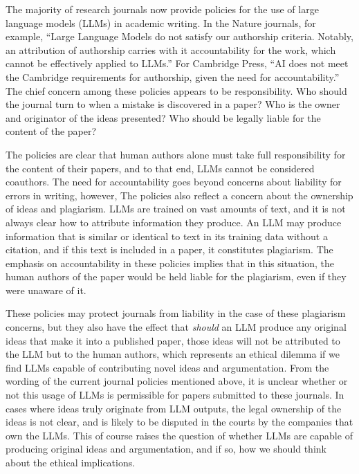 The majority of research journals now provide policies for the use of large
language models (LLMs) in academic writing. In the Nature journals, for example,
``Large Language Models do not satisfy our authorship criteria. Notably, an
attribution of authorship carries with it accountability for the work, which
cannot be effectively applied to LLMs.'' For Cambridge Press, ``AI does not meet
the Cambridge requirements for authorship, given the need for accountability.''
The chief concern among these policies appears to be responsibility. Who should
the journal turn to when a mistake is discovered in a paper? Who is the owner
and originator of the ideas presented? Who should be legally liable for the
content of the paper? 

The policies are clear that human authors alone must take
full responsibility for the content of their papers, and to that end, LLMs
cannot be considered coauthors. The need for accountability goes beyond concerns
about liability for errors in writing, however, The policies also reflect a
concern about the ownership of ideas and plagiarism. LLMs are trained on vast 
amounts of text, and it is not always clear how to attribute information they
produce. An LLM may produce information that is similar or identical to text in
its training data without a citation, and if this text is included in a paper,
it constitutes plagiarism. The emphasis on accountability in these policies
implies that in this situation, the human authors of the paper would be held
liable for the plagiarism, even if they were unaware of it.

These policies may protect journals from liability in the case of these 
plagiarism concerns, but they also have the effect that \emph{should} an LLM
produce any original ideas that make it into a published paper, those ideas will
not be attributed to the LLM but to the human authors, which represents an
ethical dilemma if we find LLMs capable of contributing novel ideas and
argumentation. From the wording of the current journal policies mentioned above,
it is unclear whether or not this usage of LLMs is permissible for papers
submitted to these journals. In cases where ideas truly originate from LLM
outputs, the legal ownership of the ideas is not clear, and is likely to be
disputed in the courts by the companies that own the LLMs. This of course raises
the question of whether LLMs are capable of producing original ideas and
argumentation, and if so, how we should think about the ethical implications.

